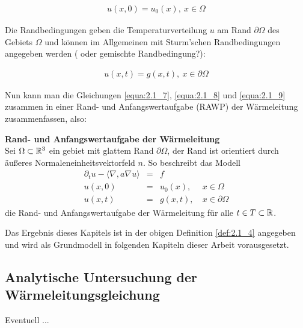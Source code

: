\begin{eqnarray}
	u(x,0) = u_0(x), \ x \in \Omega
	\label{equa:2.1_8}
\end{eqnarray}

Die Randbedingungen geben die Temperaturverteilung $u$ am Rand $\partial \Omega$ des Gebiets $\Omega$ und können im Allgemeinen mit Sturm'schen Randbedingungen angegeben werden ({\color{red} oder gemischte Randbedingung?}):

\begin{eqnarray}
	u(x,t) = g(x, t), \ x \in \partial \Omega 
	\label{equa:2.1_9}
\end{eqnarray}   

Nun kann man die Gleichungen \ref{equa:2.1_7}, \ref{equa:2.1_8} und \ref{equa:2.1_9} zusammen in einer Rand- und Anfangswertaufgabe (RAWP) der Wärmeleitung zusammenfassen, also:

\begin{Definition}
	\textbf{Rand- und Anfangswertaufgabe der Wärmeleitung} \\
	Sei $\Omega \subset	\mathbb{R}^3$ ein gebiet mit glattem Rand $\partial \Omega$, der Rand ist orientiert durch äußeres Normaleneinheitsvektorfeld $n$. So beschreibt das Modell
	\begin{equation}
		\begin{array}{llll}
			\partial_t u - \langle \nabla, a\nabla u \rangle & = & f & \\
			u(x,0) & = & u_0(x), & \ x \in \Omega \\
				u(x,t) & = & g(x, t), & \ x \in \partial \Omega
		\end{array}
		\label{equa:2.1_10}
	\end{equation}
	die Rand- und Anfangswertaufgabe der Wärmeleitung für alle $t \in T \subset \mathbb{R}$. 
	\label{def:2.1_4}
\end{Definition}

Das Ergebnis dieses Kapitels ist in der obigen Definition \ref{def:2.1_4} angegeben und wird als Grundmodell in folgenden Kapiteln dieser Arbeit vorausgesetzt.  

\subsection{Analytische Untersuchung der Wärmeleitungsgleichung}

Eventuell ...





